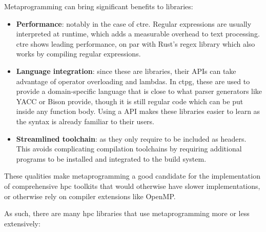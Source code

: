 \documentclass[../main]{subfiles}
\begin{document}
Metaprogramming can bring significant benefits to libraries:

\begin{itemize}

  \item

\textbf{Performance}: notably in the case of \gls{ctre}.
Regular expressions are usually interpreted at runtime,
which adds a measurable overhead to text processing.
\gls{ctre} shows leading performance, on par with Rust's regex library
which also works by compiling regular expressions.

  \item

\textbf{Language integration}: since these are \cpp libraries,
their APIs can take advantage of \cpp operator overloading and lambdas.
In \gls{ctpg}, these are used to provide a domain-specific language that is close to
what parser generators like YACC or Bison provide,
though it is still regular \cpp code which can be put inside any function body.
Using a \cpp API makes these libraries easier to learn
as the syntax is already familiar to their users.

  \item

\textbf{Streamlined toolchain}: as they only require to be included as headers.
This avoids complicating compilation toolchains by requiring additional programs
to be installed and integrated to the build system.

\end{itemize}

These qualities make metaprogramming a good candidate for the implementation
of comprehensive \gls{hpc} toolkits that would otherwise have
slower implementations, or otherwise rely on compiler extensions like OpenMP.

As such, there are many \cpp \gls{hpc} libraries that use metaprogramming
more or less extensively:
\end{document}
